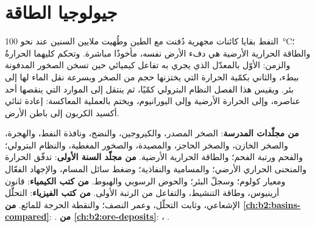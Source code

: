 \chapter{جيولوجيا الطاقة}\label{ch:b2:energy-geology}

النفط بقايا كائنات مجهرية دُفنت مع الطين وطُهيت ملايين السنين عند
نحو \qty{100}{\celsius}؛ والطاقة الحرارية الأرضية هي دفء الأرض نفسه، مأخوذًا مباشرة.
وتحكم كليهما الحرارةُ والزمن: الأوّل بالمعدّل الذي يجري به تفاعل كيميائي حين
تسخن الصخور المدفونة ببطء، والثاني بكمّية الحرارة التي يختزنها حجم من الصخر وبسرعة نقل الماء
لها إلى بئر. ويقيس هذا الفصل النظام البترولي كمّيًا، ثم ينتقل إلى الموارد التي
ينقصها أحد عناصره، وإلى الحرارة الأرضية وإلى اليورانيوم، ويختم بالعملية المعاكسة:
إعادة ثنائي أكسيد الكربون إلى باطن الأرض.

\begin{recall}
\textbf{من مجلّدات المدرسة}: الصخر المصدر، والكيروجين، والنضج، ونافذة النفط، والهجرة،
والصخر الخازن، والصخر الحاجز، والمصيدة، والصخور المغطية، والنظام البترولي؛ والفحم ورتبة الفحم؛ والطاقة الحرارية الأرضية.
\textbf{من مجلّد السنة الأولى}: تدفّق الحرارة والمنحنى الحراري الأرضي؛ والمسامية والنفاذية؛ وضغط سائل
المسام، والإجهاد الفعّال ومعيار كولوم؛ وسجلّ البئر؛ والحوض الرسوبي
والهبوط. \textbf{من كتب الكيمياء}: قانون أرينيوس، وطاقة التنشيط، والتفاعل من الرتبة
الأولى. \textbf{من كتب الفيزياء}: التحلّل الإشعاعي، وثابت التحلّل، وعمر النصف؛ والنقطة
الحرجة للمائع. \textbf{من \cref{ch:b2:basins-compared}}: .
\textbf{من \cref{ch:b2:ore-deposits}}: ، .
\end{recall}

